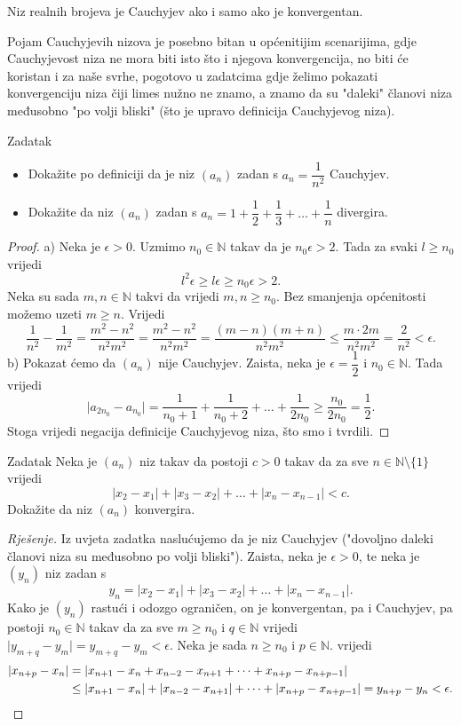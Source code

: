 \begin{remark}
Niz realnih brojeva je Cauchyjev ako i samo ako je konvergentan.
\end{remark}
Pojam Cauchyjevih nizova je posebno bitan u općenitijim scenarijima, gdje Cauchyjevost niza ne mora biti isto što i njegova konvergencija, no biti će koristan i za naše svrhe, pogotovo u zadatcima gdje želimo pokazati konvergenciju niza čiji limes nužno ne znamo, a znamo da su "daleki" članovi niza međusobno "po volji bliski" (što je upravo definicija Cauchyjevog niza).
\begin{exercise}{Zadatak} \textbf{}
\begin{itemize}
\item[a)] Dokažite po definiciji da je niz $(a_n)$ zadan s $a_n=\dfrac{1}{n^2}$ Cauchyjev.
\item[b)] Dokažite da niz $(a_n)$ zadan s $a_n=1+\dfrac{1}{2}+\dfrac{1}{3}+\dots+\dfrac{1}{n}$ divergira.
\end{itemize}
\end{exercise}
\begin{proof}
a) Neka je $\epsilon>0$. Uzmimo $n_0\in \mathbb{N}$ takav da je $n_0\epsilon>2$. Tada za svaki $l\geq n_0$ vrijedi
$$l^2\epsilon\geq l\epsilon\geq n_0\epsilon>2.$$
Neka su sada $m, n\in \mathbb{N}$ takvi da vrijedi $m, n\geq n_0$. Bez smanjenja općenitosti možemo uzeti $m\geq n$. Vrijedi
\[
\dfrac{1}{n^2}-\dfrac{1}{m^2}=\dfrac{m^2-n^2}{n^2m^2}=\dfrac{m^2-n^2}{n^2m^2}=\dfrac{(m-n)(m+n)}{n^2m^2}\leq \dfrac{m\cdot 2m}{n^2m^2}=\dfrac{2}{n^2}<\epsilon.
\]
b) Pokazat ćemo da $(a_n)$ nije Cauchyjev. Zaista, neka je $\epsilon=\dfrac{1}{2}$ i $n_0\in \mathbb{N}$. Tada vrijedi
$$\lvert a_{2n_0}-a_{n_0}\rvert=\dfrac{1}{n_0+1}+\dfrac{1}{n_0+2}+\dots+\dfrac{1}{2n_0}\geq \dfrac{n_0}{2n_0}=\dfrac{1}{2}.$$
Stoga vrijedi negacija definicije Cauchyjevog niza, što smo i tvrdili.
\end{proof}
\begin{exercise}{Zadatak}
Neka je $(a_n)$ niz takav da postoji $c>0$ takav da za sve $n\in \mathbb{N}\setminus\{1\}$ vrijedi
$$\lvert x_2-x_1\rvert+\lvert x_3-x_2\rvert+\dots+\lvert x_n-x_{n-1}\rvert<c.$$
Dokažite da niz $(a_n)$ konvergira.
\end{exercise}
\begin{proof}[Rješenje]
Iz uvjeta zadatka naslućujemo da je niz Cauchyjev ("dovoljno daleki članovi niza su međusobno po volji bliski"). Zaista, neka je $\epsilon>0$, te neka je $(y_n)$ niz zadan s
$$y_n=\lvert x_2-x_1\rvert+\lvert x_3-x_2\rvert+\dots+\lvert x_n-x_{n-1}\rvert.$$
Kako je $(y_n)$ rastući i odozgo ograničen, on je konvergentan, pa i Cauchyjev, pa postoji $n_0\in \mathbb{N}$ takav da za sve $m\geq n_0$ i $q\in \mathbb{N}$ vrijedi $\lvert y_{m+q}-y_{m}\rvert=y_{m+q}-y_{m}<\epsilon$. Neka je sada $n\geq n_0$ i $p\in \mathbb{N}$. vrijedi
\begin{align*}
\lvert x_{n+p}-x_n\rvert&=\lvert x_{n+1}-x_{n}+x_{n-2}-x_{n+1}+\dots+ x_{n+p}-x_{n+p-1}\rvert\\
&\leq \lvert x_{n+1}-x_{n}\rvert+\lvert x_{n-2}-x_{n+1}\rvert+\dots+ \lvert x_{n+p}-x_{n+p-1}\rvert=y_{n+p}-y_{n}<\epsilon. \qedhere
\end{align*}
\end{proof}
